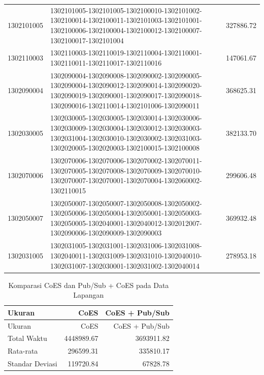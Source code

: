\begin{longtable}[!]{lp{8cm}r}
		1302101005 & 1302101005-1302101005-1302100010-1302101002-1302100014-1302100011-1302101003-1302101001-1302100006-1302100004-1302100012-1302100007-1302100017-1302101004 & 327886.72 \\
		1302110003 & 1302110003-1302110019-1302110004-1302110001-1302110011-1302110017-1302110016 & 147061.67 \\
		1302090004 & 1302090004-1302090008-1302090002-1302090005-1302090004-1302090012-1302090014-1302090020-1302090019-1302090001-1302090017-1302090018-1302090016-1302110014-1302101006-1302090011 & 368625.31 \\
		1302030005 & 1302030005-1302030005-1302030014-1302030006-1302030009-1302030004-1302030012-1302030003-1302031004-1302030010-1302030002-1302031003-1302020005-1302020003-1302100015-1302100008 & 382133.70 \\
		1302070006 & 1302070006-1302070006-1302070002-1302070011-1302070005-1302070008-1302070009-1302070010-1302070007-1302070001-1302070004-1302060002-1302110015 & 299606.48 \\
		1302050007 & 1302050007-1302050007-1302050008-1302050002-1302050006-1302050004-1302050001-1302050003-1302050005-1302040001-1302040012-1302012007-1302090006-1302090009-1302090003 & 369932.48 \\
		1302031005 & 1302031005-1302031001-1302031006-1302031008-1302040011-1302031009-1302031010-1302040010-1302031007-1302030001-1302031002-1302040014 & 278953.18 \\
\end{longtable}


\begin{longtable}[!]{lrr}
	\caption{Komparasi CoES dan Pub/Sub + CoES pada Data Lapangan}
	\label{tbl:test_result_enumerator_quit_field}\\
	\toprule
		Ukuran & CoES & CoES + Pub/Sub\\ 
	\midrule
	\endfirsthead
	\toprule
		Ukuran & CoES & CoES + Pub/Sub\\ 
	\midrule
	\endhead
	\bottomrule
	\endfoot
		Total Waktu & 4448989.67 & 3693911.82\\
		Rata-rata & 296599.31 & 335810.17\\
		Standar Deviasi & 119720.84 & 67828.78\\
\end{longtable}


